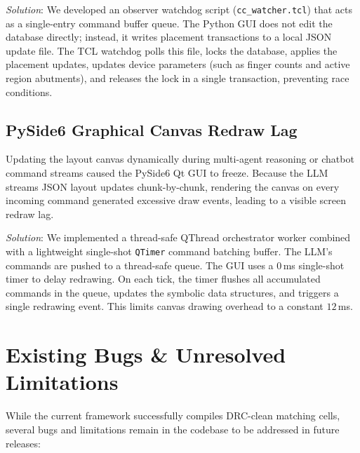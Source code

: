 \textit{Solution}: We developed an observer watchdog script (\texttt{cc\_watcher.tcl}) that acts as a single-entry command buffer queue. The Python GUI does not edit the database directly; instead, it writes placement transactions to a local JSON update file. The TCL watchdog polls this file, locks the database, applies the placement updates, updates device parameters (such as finger counts and active region abutments), and releases the lock in a single transaction, preventing race conditions.

\subsection{PySide6 Graphical Canvas Redraw Lag}
Updating the layout canvas dynamically during multi-agent reasoning or chatbot command streams caused the PySide6 Qt GUI to freeze. Because the LLM streams JSON layout updates chunk-by-chunk, rendering the canvas on every incoming command generated excessive draw events, leading to a visible screen redraw lag.

\textit{Solution}: We implemented a thread-safe QThread orchestrator worker combined with a lightweight single-shot \texttt{QTimer} command batching buffer. The LLM's commands are pushed to a thread-safe queue. The GUI uses a $0$\,ms single-shot timer to delay redrawing. On each tick, the timer flushes all accumulated commands in the queue, updates the symbolic data structures, and triggers a single redrawing event. This limits canvas drawing overhead to a constant $12$\,ms.

\section[Existing Bugs]{Existing Bugs \& Unresolved Limitations}
\label{sec:existing_bugs}

While the current framework successfully compiles DRC-clean matching cells, several bugs and limitations remain in the codebase to be addressed in future releases:

